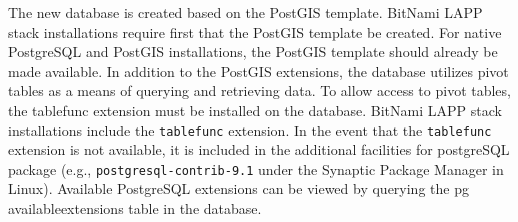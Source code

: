 The new database is created based on the PostGIS template.  
BitNami LAPP stack installations require first that the PostGIS template be created.  
For native PostgreSQL and PostGIS installations, the PostGIS template should already be made available.  
In addition to the PostGIS extensions, the database utilizes pivot tables as a means of querying and retrieving data.  
To allow access to pivot tables, the tablefunc extension must be installed on the database. 
BitNami LAPP stack installations include the \texttt{tablefunc} extension.  
In the event that the \texttt{tablefunc} extension is not available, it is included in the additional facilities for postgreSQL package (e.g., \texttt{postgresql-contrib-9.1} under the Synaptic Package Manager in Linux).  
Available PostgreSQL extensions can be viewed by querying the pg\textunderscore 
available\textunderscore extensions table in the database.

